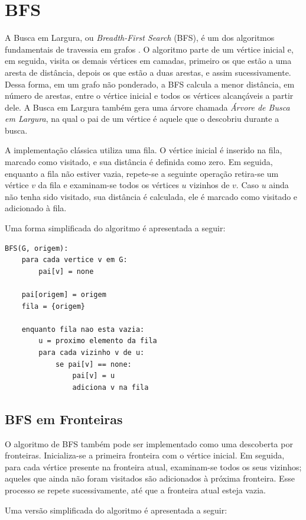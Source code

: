 \documentclass{article}
\begin{document}
\section{BFS}
A Busca em Largura, ou \textit{Breadth-First Search} (BFS), é um dos algoritmos fundamentais de travessia em grafos \cite{cormenalgorithms}. O algoritmo parte de um vértice inicial e, em seguida, visita os demais vértices em camadas, primeiro os que estão a uma aresta de distância, depois os que estão a duas arestas, e assim sucessivamente. Dessa forma, em um grafo não ponderado, a BFS calcula a menor distância, em número de arestas, entre o vértice inicial e todos os vértices alcançáveis a partir dele. A Busca em Largura também gera uma árvore chamada \textit{Árvore de Busca em Largura}, na qual o pai de um vértice é aquele que o descobriu durante a busca.

A implementação clássica utiliza uma fila. O vértice inicial é inserido na fila, marcado como visitado, e sua distância é definida como zero. Em seguida, enquanto a fila não estiver vazia, repete-se a seguinte operação retira-se um vértice $v$ da fila e examinam-se todos os vértices $u$ vizinhos de $v$. Caso $u$ ainda não tenha sido visitado, sua distância é calculada, ele é marcado como visitado e adicionado à fila.

Uma forma simplificada do algoritmo é apresentada a seguir:

\begin{lstlisting}
BFS(G, origem):
	para cada vertice v em G:
        pai[v] = none

    pai[origem] = origem
    fila = {origem}

    enquanto fila nao esta vazia:
		u = proximo elemento da fila
		para cada vizinho v de u:
			se pai[v] == none:
				pai[v] = u
				adiciona v na fila
\end{lstlisting}

\subsection{BFS em Fronteiras}
O algoritmo de BFS também pode ser implementado como uma descoberta por fronteiras. Inicializa-se a primeira fronteira com o vértice inicial. Em seguida, para cada vértice presente na fronteira atual, examinam-se todos os seus vizinhos; aqueles que ainda não foram visitados são adicionados à próxima fronteira. Esse processo se repete sucessivamente, até que a fronteira atual esteja vazia.

Uma versão simplificada do algoritmo é apresentada a seguir:
\end{document}
